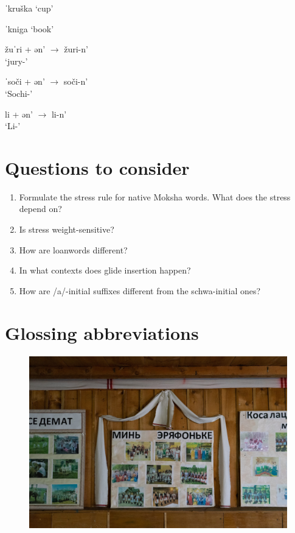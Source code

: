 \documentclass[a4paper, 12pt]{article}
\begin{document}
\begin{minipage}[t]{.45\linewidth}
\ex\label{ex:krushka}
	ˈkruška `cup'
\xe
\end{minipage}
\hfill
\begin{minipage}[t]{.45\linewidth}
\ex\label{ex:kniga}
	ˈkniga `book' 
\xe
\end{minipage}
	
\begin{minipage}[t]{.3\linewidth}
\ex\label{ex:lw1s}
	žuˈri + ən' $\rightarrow$ žuri-n' \\`jury-{\Gen}' 
\xe
\end{minipage}
\hfill
\begin{minipage}[t]{.3\linewidth}
\ex\label{ex:lw2s}
	ˈsoči + ən' $\rightarrow$ soči-n' \\ `Sochi-{\Gen}' 
\xe
\end{minipage}	
\hfill
\begin{minipage}[t]{.3\linewidth}
\ex\label{ex:lw3s}
	li + ən' $\rightarrow$ li-n' \\ `Li-{\Gen}'
\xe
\end{minipage}
	
	\section{Questions to consider}
		
\begin{enumerate}[$\gg$]
	\item Formulate the stress rule for native Moksha words. What does the stress depend on?
	\item Is stress weight-sensitive?
	\item How are loanwords different?
	\item In what contexts does glide insertion happen?
	\item How are /a/-initial suffixes different from the schwa-initial ones?
\end{enumerate}
		

	\section*{Glossing abbreviations}
	
\printglossaries
	
\printbibliography

	\begin{figure}[H]
		\centering
		\includegraphics[scale=.166]{mok-end}
	\end{figure}
\end{document}
